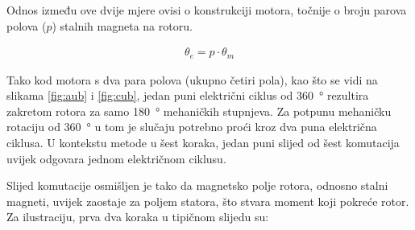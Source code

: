 \documentclass[diplomskirad, upload]{fer}
\begin{document}
Odnos između ove dvije mjere ovisi o konstrukciji motora, točnije o broju
parova polova ($p$) stalnih magneta na rotoru.

\begin{align}
	\theta_e = p \cdot \theta_m
\end{align}

Tako kod motora s dva para polova (ukupno četiri pola), kao što se vidi na
slikama \ref{fig:aub} i \ref{fig:cub}, jedan puni električni ciklus od
\SI{360}{\degree} rezultira zakretom rotora za samo \SI{180}{\degree}
mehaničkih stupnjeva. Za potpunu mehaničku rotaciju od \SI{360}{\degree} u tom
je slučaju potrebno proći kroz dva puna električna ciklusa. U kontekstu metode
u šest koraka, jedan puni slijed od šest komutacija uvijek odgovara jednom
električnom ciklusu.

\bigskip
Slijed komutacije osmišljen je tako da magnetsko polje rotora, odnosno stalni
magneti, uvijek zaostaje za poljem statora, što stvara moment koji pokreće
rotor. Za ilustraciju, prva dva koraka u tipičnom slijedu su:
\end{document}
